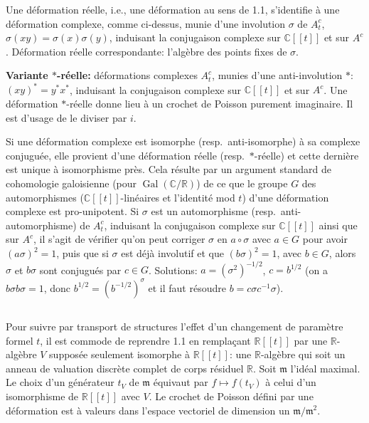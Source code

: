 \documentclass[11pt,a4paper]{article}
\theoremstyle{plain}
\theoremstyle{definition}
\DeclareMathOperator{\Gal}{Gal}
\newcommand{\R}{\mathbb{R}}
\newcommand{\C}{\mathbb{C}}
\begin{document}
Une d\'eformation r\'eelle, i.e., une d\'eformation au sens de 1.1, s'identifie \`a une
d\'eformation complexe, comme ci-dessus, munie d'une involution $\sigma$ de $A_{t}^{c}$, $\sigma(xy) = \sigma(x)\sigma(y)$, induisant la conjugaison complexe sur $\C[[t]]$ et sur $A^{c}$. D\'eformation r\'eelle
correspondante: l'alg\`ebre des points fixes de $\sigma$.

\textbf{Variante $*$-r\'eelle:} d\'eformations complexes $A_{t}^{c}$, munies d'une anti-involution $*$:
$(xy)^{*} = y^{*}x^{*}$, induisant la conjugaison complexe sur $\C[[t]]$ et sur $A^{c}$. Une d\'eformation $*$-r\'eelle donne lieu \`a un crochet de Poisson purement imaginaire. Il est d'usage
de le diviser par $i$.

Si une d\'eformation complexe est isomorphe (resp.\ anti-isomorphe) \`a sa complexe conjugu\'ee, elle provient d'une d\'eformation r\'eelle (resp.\ $*$-r\'eelle) et cette
derni\`ere est unique \`a isomorphisme pr\`es. Cela r\'esulte par un argument standard
de cohomologie galoisienne (pour $\Gal(\C/\R)$) de ce que le groupe $G$ des automorphismes ($\C[[t]]$-lin\'eaires et l'identit\'e mod $t$) d'une d\'eformation complexe est pro-unipotent. Si $\sigma$ est un automorphisme (resp.\ anti-automorphisme) de $A_{t}^{c}$, induisant
la conjugaison complexe sur $\C[[t]]$ ainsi que sur $A^{c}$, il s'agit de v\'erifier qu'on peut
corriger $\sigma$ en $a \circ \sigma$ avec $a \in G$ pour avoir $(a\sigma)^{2} = 1$, puis que si $\sigma$ est d\'ej\`a involutif
et que $(b\sigma)^{2} = 1$, avec $b \in G$, alors $\sigma$ et $b\sigma$ sont conjugu\'es par $c \in G$. Solutions:
$a = (\sigma^{2})^{-1/2}$, $c = b^{1/2}$ (on a $b\sigma b\sigma = 1$, donc $b^{1/2} = (b^{-1/2})^{\sigma}$ et il faut r\'esoudre
$b = c \sigma c^{-1} \sigma$).

\subsection{}
Pour suivre par transport de structures l'effet d'un changement de param\`etre
formel $t$, il est commode de reprendre 1.1 en rempla\c{c}ant $\R[[t]]$ par une $\R$-alg\`ebre $V$
suppos\'ee seulement isomorphe \`a $\R[[t]]$: une $\R$-alg\`ebre qui soit un anneau de valuation discr\`ete complet de corps r\'esiduel $\R$. Soit $\mathfrak{m}$ l'id\'eal maximal. Le choix d'un
g\'en\'erateur $t_{V}$ de $\mathfrak{m}$ \'equivaut par $f \mapsto f(t_{V})$ \`a celui d'un isomorphisme de $\R[[t]]$ avec
$V$. Le crochet de Poisson d\'efini par une d\'eformation est \`a valeurs dans l'espace
vectoriel de dimension un $\mathfrak{m}/\mathfrak{m}^{2}$.
\end{document}
